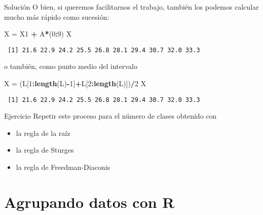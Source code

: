 \documentclass[
  ignorenonframetext,
]{beamer}
\newenvironment{Shaded}{\begin{snugshade}}{\end{snugshade}}
\newcommand{\DecValTok}[1]{\textcolor[rgb]{0.00,0.00,0.81}{#1}}
\newcommand{\KeywordTok}[1]{\textcolor[rgb]{0.13,0.29,0.53}{\textbf{#1}}}
\newcommand{\NormalTok}[1]{#1}
\newcommand{\OperatorTok}[1]{\textcolor[rgb]{0.81,0.36,0.00}{\textbf{#1}}}
\newcommand{\StringTok}[1]{\textcolor[rgb]{0.31,0.60,0.02}{#1}}
\providecommand{\tightlist}{%
  \setlength{\itemsep}{0pt}\setlength{\parskip}{0pt}}
\begin{document}
\begin{frame}[fragile]{Solución}
\protect\hypertarget{soluciuxf3n-10}{}
O bien, si queremos facilitarnos el trabajo, también los podemos
calcular mucho más rápido como sucesión:

\begin{Shaded}
\begin{Highlighting}[]
\NormalTok{X =}\StringTok{ }\NormalTok{X1 }\OperatorTok{+}\StringTok{ }\NormalTok{A}\OperatorTok{*}\NormalTok{(}\DecValTok{0}\OperatorTok{:}\DecValTok{9}\NormalTok{)}
\NormalTok{X}
\end{Highlighting}
\end{Shaded}

\begin{verbatim}
 [1] 21.6 22.9 24.2 25.5 26.8 28.1 29.4 30.7 32.0 33.3
\end{verbatim}

o también, como punto medio del intervalo

\begin{Shaded}
\begin{Highlighting}[]
\NormalTok{X =}\StringTok{ }\NormalTok{(L[}\DecValTok{1}\OperatorTok{:}\KeywordTok{length}\NormalTok{(L)}\OperatorTok{{-}}\DecValTok{1}\NormalTok{]}\OperatorTok{+}\NormalTok{L[}\DecValTok{2}\OperatorTok{:}\KeywordTok{length}\NormalTok{(L)])}\OperatorTok{/}\DecValTok{2}
\NormalTok{X}
\end{Highlighting}
\end{Shaded}

\begin{verbatim}
 [1] 21.6 22.9 24.2 25.5 26.8 28.1 29.4 30.7 32.0 33.3
\end{verbatim}
\end{frame}

\begin{frame}{Ejercicio}
\protect\hypertarget{ejercicio}{}
Repetir este proceso para el número de clases obtenido con

\begin{itemize}
\tightlist
\item
  la regla de la raíz
\item
  la regla de Sturges
\item
  la regla de Freedman-Diaconis
\end{itemize}
\end{frame}

\hypertarget{agrupando-datos-con-r}{%
\section{Agrupando datos con R}\label{agrupando-datos-con-r}}
\end{document}
